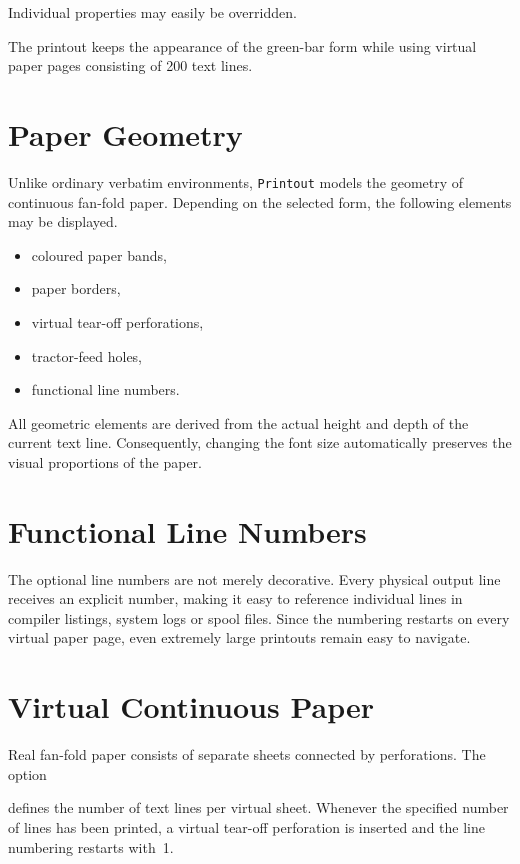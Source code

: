 \documentclass[
11pt,
a4paper,
oneside
]{scrbook}
\begin{document}


Individual properties may easily be overridden.




The printout keeps the appearance of the green-bar form while using
virtual paper pages consisting of 200 text lines.

\section{Paper Geometry}
Unlike ordinary verbatim environments, \texttt{Printout} models the
geometry of continuous fan-fold paper.
Depending on the selected form, the following elements may be displayed.
\begin{itemize}
	\item coloured paper bands,
	\item paper borders,
	\item virtual tear-off perforations,
	\item tractor-feed holes,
	\item functional line numbers.
\end{itemize}
All geometric elements are derived from the actual height and depth of
the current text line. Consequently, changing the font size
automatically preserves the visual proportions of the paper.

\section{Functional Line Numbers}
The optional line numbers are not merely decorative.
Every physical output line receives an explicit number, making it easy
to reference individual lines in compiler listings, system logs or spool
files.
Since the numbering restarts on every virtual paper page, even extremely
large printouts remain easy to navigate.

\section{Virtual Continuous Paper}

Real fan-fold paper consists of separate sheets connected by
perforations.
The option




defines the number of text lines per virtual sheet.
Whenever the specified number of lines has been printed, a virtual
tear-off perforation is inserted and the line numbering restarts with~1.
\end{document}
